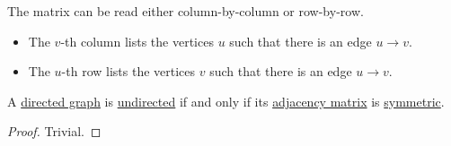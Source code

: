 \begin{example}
  The matrix can be read either column-by-column or row-by-row.
  \begin{itemize}
    \item The \( v \)-th column lists the vertices \( u \) such that there is an edge \( u \to v \).
    \item The \( u \)-th row lists the vertices \( v \) such that there is an edge \( u \to v \).
  \end{itemize}
\end{example}

\begin{proposition}\label{thm:graph_undirected_iff_adjacency_matrix_is_symmetric}
  A \hyperref[def:graph/directed]{directed graph} is \hyperref[def:graph/directed]{undirected} if and only if its \hyperref[def:graph_matrices/adjacency]{adjacency matrix} is \hyperref[def:symmetric_matrix]{symmetric}.
\end{proposition}
\begin{proof}
  Trivial.
\end{proof}

